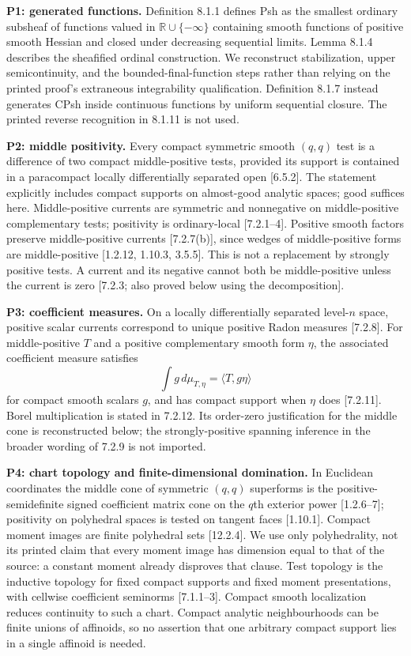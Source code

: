 \documentclass[
  11pt,
]{article}
\begin{document}
\textbf{P1: generated functions.} Definition 8.1.1 defines Psh as the
smallest ordinary subsheaf of functions valued in
\(\mathbb R\cup\{-\infty\}\) containing smooth functions of positive
smooth Hessian and closed under decreasing sequential limits. Lemma
8.1.4 describes the sheafified ordinal construction. We reconstruct
stabilization, upper semicontinuity, and the bounded-final-function
steps rather than relying on the printed proof's extraneous
integrability qualification. Definition 8.1.7 instead generates CPsh
inside continuous functions by uniform sequential closure. The printed
reverse recognition in 8.1.11 is not used.

\textbf{P2: middle positivity.} Every compact symmetric smooth \((q,q)\)
test is a difference of two compact middle-positive tests, provided its
support is contained in a paracompact locally differentially separated
open {[}6.5.2{]}. The statement explicitly includes compact supports on
almost-good analytic spaces; good suffices here. Middle-positive
currents are symmetric and nonnegative on middle-positive complementary
tests; positivity is ordinary-local {[}7.2.1--4{]}. Positive smooth
factors preserve middle-positive currents {[}7.2.7(b){]}, since wedges
of middle-positive forms are middle-positive {[}1.2.12, 1.10.3,
3.5.5{]}. This is not a replacement by strongly positive tests. A
current and its negative cannot both be middle-positive unless the
current is zero {[}7.2.3; also proved below using the decomposition{]}.

\textbf{P3: coefficient measures.} On a locally differentially separated
level-\(n\) space, positive scalar currents correspond to unique
positive Radon measures {[}7.2.8{]}. For middle-positive \(T\) and a
positive complementary smooth form \(\eta\), the associated coefficient
measure satisfies \[\int g\,d\mu_{T,\eta}=\langle T,g\eta\rangle\] for
compact smooth scalars \(g\), and has compact support when \(\eta\) does
{[}7.2.11{]}. Borel multiplication is stated in 7.2.12. Its order-zero
justification for the middle cone is reconstructed below; the
strongly-positive spanning inference in the broader wording of 7.2.9 is
not imported.

\textbf{P4: chart topology and finite-dimensional domination.} In
Euclidean coordinates the middle cone of symmetric \((q,q)\) superforms
is the positive-semidefinite signed coefficient matrix cone on the
\(q\)th exterior power {[}1.2.6--7{]}; positivity on polyhedral spaces
is tested on tangent faces {[}1.10.1{]}. Compact moment images are
finite polyhedral sets {[}12.2.4{]}. We use only polyhedrality, not its
printed claim that every moment image has dimension equal to that of the
source: a constant moment already disproves that clause. Test topology
is the inductive topology for fixed compact supports and fixed moment
presentations, with cellwise coefficient seminorms {[}7.1.1--3{]}.
Compact smooth localization reduces continuity to such a chart. Compact
analytic neighbourhoods can be finite unions of affinoids, so no
assertion that one arbitrary compact support lies in a single affinoid
is needed.
\end{document}
